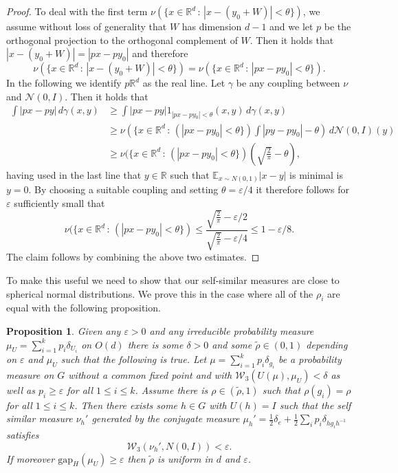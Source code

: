 \documentclass[10pt, english,oneside,reqno]{amsart}
\theoremstyle{plain}
\newtheorem{proposition}[theorem]{Proposition}
\theoremstyle{remark}
\numberwithin{equation}{section}
\numberwithin{figure}{section}
\newcommand{\eps}{\varepsilon}
\newcommand{\R}{\mathbb{R}}
\begin{document}
\begin{proof}
    To deal with the first term $\nu(\{ x \in \R^d \,:\, |x-(y_0 + W)| < \theta  \})$, we assume without loss of generality that $W$ has dimension $d-1$ and we let $p$ be the orthogonal projection to the orthogonal complement of $W$. Then it holds that $|x - (y_0 + W)| = |px - py_0|$ and therefore $$\nu(\{ x \in \R^d \,:\, |x-(y_0 + W)| < \theta  \}) = \nu(\{ x \in \R^d \,:\, |px-py_0| < \theta  \}).$$ In the following we identify $p\R^{d}$ as the real line. Let $\gamma$ be any coupling between $\nu$ and $\mathcal{N}(0,I)$. Then it holds that \begin{align*}
        \int |px-py| \, d\gamma(x,y) &\geq \int |px-py| 1_{|px - py_0| < \theta}(x,y) \, d\gamma(x,y) \\
        &\geq \nu(\{ x \in \R^d \,:\, (|px-py_0| < \theta  \})\int |py-py_0| - \theta) \, d\mathcal{N}(0,I)(y) \\ &\geq \nu(\{ x \in \R^d \,:\, (|px-py_0| < \theta  \}) \left(\sqrt{\frac{2}{\pi}} - \theta\right),
    \end{align*} having used in the last line that $y \in \R$ such that $\mathbb{E}_{x \sim N(0,1)} |x-y|$ is minimal is $y=0$. By choosing a suitable coupling and setting $\theta = \eps/4$ it therefore follows for $\eps$ sufficiently small that  $$\nu(\{ x \in \R^d \,:\, (|px-py_0| < \theta  \}) \leq \frac{\sqrt{\frac{2}{\pi}} - \eps/2}{\sqrt{\frac{2}{\pi}} - \eps/4} \leq 1 - \eps/8.$$ The claim follows by combining the above two estimates.
\end{proof}

To make this useful we need to show that our self-similar measures are close to spherical normal distributions. We prove this in the case where all of the $\rho_i$ are equal with the following proposition.

\begin{proposition} \label{prop:homo_close_to_normal}
	Given any $\varepsilon > 0$ and any irreducible probability measure $\mu_U = \sum_{i=1}^k p_i \delta_{U_i}$ on $O(d)$ there is some $\delta > 0$ and some $\tilde{\rho} \in (0, 1)$ depending on $\eps$ and $\mu_U$ such that the following is true. Let $\mu = \sum_{i = 1}^k p_i\delta_{g_i}$ be a probability measure on $G$ without a common fixed point and with $\mathcal{W}_3(U(\mu), \mu_U) < \delta$ 
    as well as $p_i \geq \eps$ for all $1\leq i \leq k$. Assume there is $\rho \in (\tilde{\rho}, 1)$ such that $\rho(g_i) = \rho$ for all $1\leq i \leq k$. Then there exists some $h \in G$ with $U(h) = I$ such that the self similar measure $\nu_h'$ generated by the conjugate measure $\mu_h' = \frac{1}{2}\delta_e + \frac{1}{2} \sum_i p_i \delta_{hg_ih^{-1}}$ satisfies
	\begin{equation*}
		\mathcal{W}_3(\nu_h', N(0, I)) < \varepsilon.
	\end{equation*}
    If moreover $\mathrm{gap}_H(\mu_U) \geq \eps$ then $\tilde{\rho}$ is uniform in $d$ and $\eps$.
\end{proposition}
\end{document}
